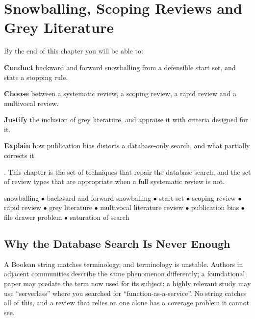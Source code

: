 \chapter{Snowballing, Scoping Reviews and Grey Literature}\label{ch:greylit}

\begin{outcomes}
By the end of this chapter you will be able to:
\begin{tight}
  \item \textbf{Conduct} backward and forward snowballing from a defensible
    start set, and state a stopping rule.
  \item \textbf{Choose} between a systematic review, a scoping review, a rapid
    review and a multivocal review.
  \item \textbf{Justify} the inclusion of grey literature, and appraise it with
    criteria designed for it.
  \item \textbf{Explain} how publication bias distorts a database-only search,
    and what partially corrects it.
\end{tight}
\end{outcomes}

\begin{prereq}
. This chapter is the set of techniques that repair the database
search, and the set of review types that are appropriate when a full systematic
review is not.
\end{prereq}

\begin{keyterms}
snowballing $\bullet$ backward and forward snowballing $\bullet$ start set
$\bullet$ scoping review $\bullet$ rapid review $\bullet$ grey literature
$\bullet$ multivocal literature review $\bullet$ publication bias $\bullet$
file drawer problem $\bullet$ saturation of search
\end{keyterms}

\section{Why the Database Search Is Never Enough}

A Boolean string matches terminology, and terminology is unstable. Authors in
adjacent communities describe the same phenomenon differently; a foundational
paper may predate the term now used for its subject; a highly relevant study
may use ``serverless'' where you searched for ``function-as-a-service''. No
string catches all of this, and a review that relies on one alone has a
coverage problem it cannot see.

